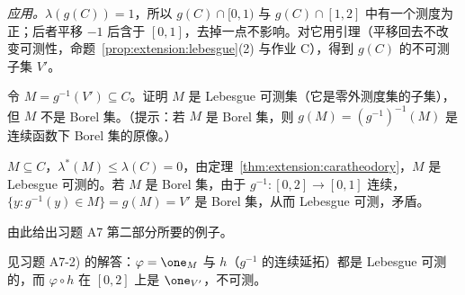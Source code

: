 \begin{probleme}
\begin{questions}
\begin{solution}
\emph{应用。}$\lambda(g(C))=1$，所以 $g(C)\cap[0,1)$ 与 $g(C)\cap[1,2]$ 中有一个测度为正；后者平移 $-1$ 后含于 $[0,1]$，去掉一点不影响。对它用引理（平移回去不改变可测性，命题~\ref{prop:extension:lebesgue}(2) 与作业 C），得到 $g(C)$ 的不可测子集 $V'$。
\end{solution}
\item 令 $M=g^{-1}(V')\subseteq C$。证明 $M$ 是 Lebesgue 可测集（它是零外测度集的子集），但 $M$ 不是 Borel 集。（提示：若 $M$ 是 Borel 集，则 $g(M)=(g^{-1})^{-1}(M)$ 是连续函数下 Borel 集的原像。）
\begin{solution}
$M\subseteq C$，$\lambda^*(M)\leqslant\lambda(C)=0$，由定理~\ref{thm:extension:caratheodory}，$M$ 是 Lebesgue 可测的。若 $M$ 是 Borel 集，由于 $g^{-1}:[0,2]\to[0,1]$ 连续，$\{y:g^{-1}(y)\in M\}=g(M)=V'$ 是 Borel 集，从而 Lebesgue 可测，矛盾。
\end{solution}
\item 由此给出习题 A7 第二部分所要的例子。
\begin{solution}
见习题 A7-2) 的解答：$\varphi=\one_M$ 与 $h$（$g^{-1}$ 的连续延拓）都是 Lebesgue 可测的，而 $\varphi\circ h$ 在 $[0,2]$ 上是 $\one_{V'}$，不可测。
\end{solution}
\end{questions}
\end{probleme}


